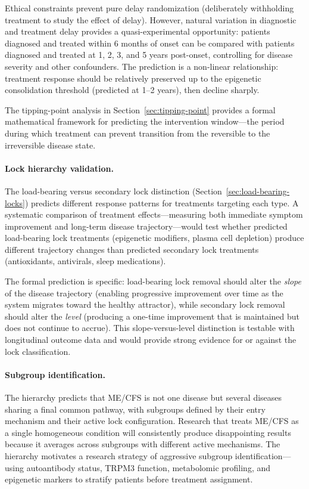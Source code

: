 Ethical constraints prevent pure delay randomization (deliberately withholding treatment to study the effect of delay). However, natural variation in diagnostic and treatment delay provides a quasi-experimental opportunity: patients diagnosed and treated within 6 months of onset can be compared with patients diagnosed and treated at 1, 2, 3, and 5 years post-onset, controlling for disease severity and other confounders. The prediction is a non-linear relationship: treatment response should be relatively preserved up to the epigenetic consolidation threshold (predicted at 1--2 years), then decline sharply.

The tipping-point analysis in Section~\ref{sec:tipping-point} provides a formal mathematical framework for predicting the intervention window---the period during which treatment can prevent transition from the reversible to the irreversible disease state.

\paragraph{Lock hierarchy validation.} The load-bearing versus secondary lock distinction (Section~\ref{sec:load-bearing-locks}) predicts different response patterns for treatments targeting each type. A systematic comparison of treatment effects---measuring both immediate symptom improvement and long-term disease trajectory---would test whether predicted load-bearing lock treatments (epigenetic modifiers, plasma cell depletion) produce different trajectory changes than predicted secondary lock treatments (antioxidants, antivirals, sleep medications).

The formal prediction is specific: load-bearing lock removal should alter the \emph{slope} of the disease trajectory (enabling progressive improvement over time as the system migrates toward the healthy attractor), while secondary lock removal should alter the \emph{level} (producing a one-time improvement that is maintained but does not continue to accrue). This slope-versus-level distinction is testable with longitudinal outcome data and would provide strong evidence for or against the lock classification.

\paragraph{Subgroup identification.} The hierarchy predicts that ME/CFS is not one disease but several diseases sharing a final common pathway, with subgroups defined by their entry mechanism and their active lock configuration. Research that treats ME/CFS as a single homogeneous condition will consistently produce disappointing results because it averages across subgroups with different active mechanisms. The hierarchy motivates a research strategy of aggressive subgroup identification---using autoantibody status, TRPM3 function, metabolomic profiling, and epigenetic markers to stratify patients before treatment assignment.

